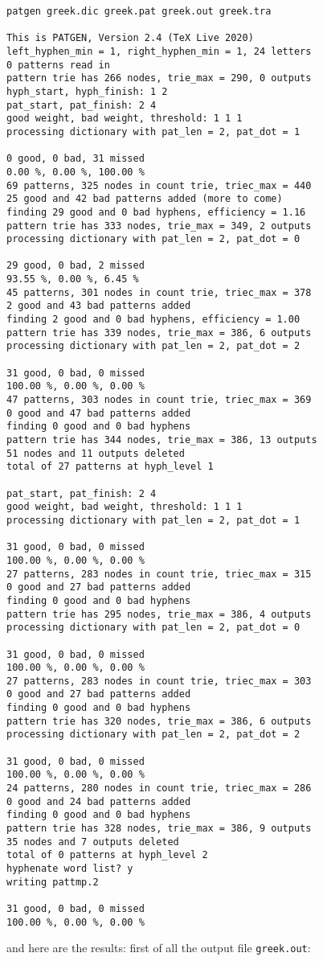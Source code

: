 \documentclass{article}
\begin{document}
\begin{verbatim}
patgen greek.dic greek.pat greek.out greek.tra

This is PATGEN, Version 2.4 (TeX Live 2020)
left_hyphen_min = 1, right_hyphen_min = 1, 24 letters
0 patterns read in
pattern trie has 266 nodes, trie_max = 290, 0 outputs
hyph_start, hyph_finish: 1 2
pat_start, pat_finish: 2 4
good weight, bad weight, threshold: 1 1 1
processing dictionary with pat_len = 2, pat_dot = 1
 
0 good, 0 bad, 31 missed
0.00 %, 0.00 %, 100.00 %
69 patterns, 325 nodes in count trie, triec_max = 440
25 good and 42 bad patterns added (more to come)
finding 29 good and 0 bad hyphens, efficiency = 1.16
pattern trie has 333 nodes, trie_max = 349, 2 outputs
processing dictionary with pat_len = 2, pat_dot = 0
 
29 good, 0 bad, 2 missed
93.55 %, 0.00 %, 6.45 %
45 patterns, 301 nodes in count trie, triec_max = 378
2 good and 43 bad patterns added 
finding 2 good and 0 bad hyphens, efficiency = 1.00
pattern trie has 339 nodes, trie_max = 386, 6 outputs
processing dictionary with pat_len = 2, pat_dot = 2
 
31 good, 0 bad, 0 missed
100.00 %, 0.00 %, 0.00 %
47 patterns, 303 nodes in count trie, triec_max = 369
0 good and 47 bad patterns added 
finding 0 good and 0 bad hyphens 
pattern trie has 344 nodes, trie_max = 386, 13 outputs
51 nodes and 11 outputs deleted
total of 27 patterns at hyph_level 1
 
pat_start, pat_finish: 2 4
good weight, bad weight, threshold: 1 1 1
processing dictionary with pat_len = 2, pat_dot = 1
 
31 good, 0 bad, 0 missed
100.00 %, 0.00 %, 0.00 %
27 patterns, 283 nodes in count trie, triec_max = 315
0 good and 27 bad patterns added 
finding 0 good and 0 bad hyphens 
pattern trie has 295 nodes, trie_max = 386, 4 outputs
processing dictionary with pat_len = 2, pat_dot = 0
 
31 good, 0 bad, 0 missed
100.00 %, 0.00 %, 0.00 %
27 patterns, 283 nodes in count trie, triec_max = 303
0 good and 27 bad patterns added 
finding 0 good and 0 bad hyphens 
pattern trie has 320 nodes, trie_max = 386, 6 outputs
processing dictionary with pat_len = 2, pat_dot = 2
 
31 good, 0 bad, 0 missed
100.00 %, 0.00 %, 0.00 %
24 patterns, 280 nodes in count trie, triec_max = 286
0 good and 24 bad patterns added 
finding 0 good and 0 bad hyphens 
pattern trie has 328 nodes, trie_max = 386, 9 outputs
35 nodes and 7 outputs deleted
total of 0 patterns at hyph_level 2
hyphenate word list? y
writing pattmp.2
 
31 good, 0 bad, 0 missed
100.00 %, 0.00 %, 0.00 %
\end{verbatim}
and here are the results: first of all the output
file {\tt greek.out}:
\end{document}
